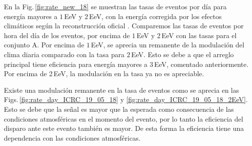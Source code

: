    En la Fig.\,\ref{fig:rate_new_18} se muestran las tasas de eventos por día para energía mayores a $1\,$EeV y $2\,$EeV, con la energía corregida por los efectos climáticos según la reconstrucción oficial \cite{data}.  Comparemos las tasas de eventos por hora del día de los eventos, por encima de $1\,$EeV y $2\,$EeV con las tasas para el conjunto  A. Por encima de $1\,$EeV, se aprecia un remanente de la modulación del clima diaria comparado con la tasa para $2\,$EeV. Esto se debe a que el arreglo principal tiene eficiencia para energía mayores a $3\,$EeV, comentado anteriormente. Por encima de 2\,EeV, la modulación en la tasa ya no es apreciable. 


   Existe una modulación remanente en la tasa de eventos como se aprecia en las Figs.\,\ref{fig:rate_day_ICRC_19_05_18} y \ref{fig:rate_day_ICRC_19_05_18_2EeV}. Esto se debe que la señal es mayor que la esperada como consecuencia de las condiciones atmosféricas en el momento del evento, por lo tanto la eficiencia del disparo ante este evento también es mayor. De esta forma la eficiencia tiene una dependencia con las condiciones atmosféricas.

